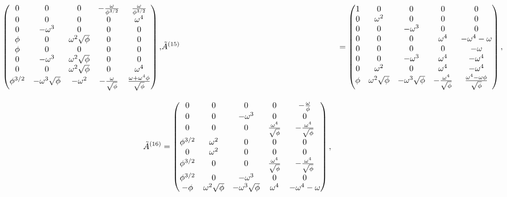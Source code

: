 \begin{align}
\begin{pmatrix}
    0 & 0 & 0 & -\frac{\omega}{\phi^{3/2}} & \frac{\omega}{\phi^{3/2}} \\
    0 & 0 & 0 & 0 & \omega^4 \\
    0 & -\omega^3 & 0 & 0 & 0 \\
    \phi & 0 & \omega^2 \sqrt{\phi} & 0 & 0 \\
    \phi & 0 & 0 & 0 & 0 \\
    0 & -\omega^3 & \omega^2 \sqrt{\phi} & 0 & 0 \\
    0 & 0 & \omega^2 \sqrt{\phi} & 0 & \omega^4 \\
    \phi^{3/2} & -\omega^3\sqrt{\phi} & -\omega^2 & -\frac{\omega}{\sqrt{\phi}} & \frac{\omega+\omega^4 \phi}{\sqrt{\phi}} \\
  \end{pmatrix}, &
  \tilde{A}^{(15)} &= \begin{pmatrix}
    1 & 0 & 0 & 0 & 0 \\
    0 & \omega^2 & 0 & 0 & 0 \\
    0 & 0 & -\omega^3 & 0 & 0 \\
    0 & 0 & 0 & \omega^4 & -\omega^4-\omega \\
    0 & 0 & 0 & 0 & -\omega \\
    0 & 0 & -\omega^3 & \omega^4 & -\omega^4 \\
    0 & \omega^2 & 0 & \omega^4 & -\omega^4 \\
    \phi & \omega^2 \sqrt{\phi} & -\omega^3\sqrt{\phi} & -\frac{\omega^4}{\sqrt{\phi}} & \frac{\omega^4-\omega \phi}{\sqrt{\phi}} \\
  \end{pmatrix}, \notag \\[2ex]
  \tilde{A}^{(16)} &= \begin{pmatrix}
    0 & 0 & 0 & 0 & -\frac{\omega}{\phi} \\
    0 & 0 & -\omega^3 & 0 & 0 \\
    0 & 0 & 0 & \frac{\omega^4}{\sqrt{\phi}} & -\frac{\omega^4}{\sqrt{\phi}} \\
    \phi^{3/2} & \omega^2 & 0 & 0 & 0 \\
    0 & \omega^2 & 0 & 0 & 0 \\
    \phi^{3/2} & 0 & 0 & \frac{\omega^4}{\sqrt{\phi}} & -\frac{\omega^4}{\sqrt{\phi}} \\
    \phi^{3/2} & 0 & -\omega^3 & 0 & 0 \\
    -\phi & \omega^2 \sqrt{\phi} & -\omega^3\sqrt{\phi} & \omega^4 & -\omega^4-\omega \\
  \end{pmatrix}, &

\end{align}
